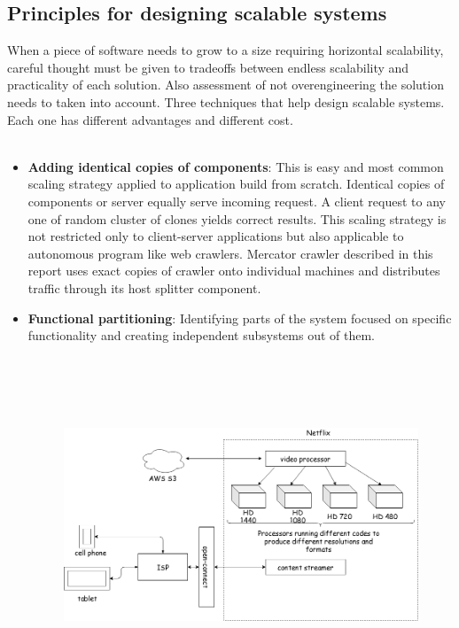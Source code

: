 \subsection{Principles for designing scalable systems}\label{appstate}
When a piece of software needs to grow to a size requiring horizontal scalability, careful thought must
be given to tradeoffs between endless scalability and practicality of each solution. Also assessment of not
overengineering the solution needs to taken into account. Three techniques that help design scalable
systems. Each one has different advantages and different cost.
\\
\\
\begin{itemize}
\item \textbf{Adding identical copies of components}\cite{scalaberules}: This is easy and most common scaling strategy
  applied to application build from scratch. Identical copies of components or server equally serve
  incoming request. A client request to any one of random cluster of clones yields correct results.
  This scaling strategy is not restricted only to client-server applications but also applicable to
  autonomous program like web crawlers. Mercator crawler described in this report uses exact copies
  of crawler onto individual machines and distributes traffic through its host splitter component.
\item \textbf{Functional partitioning}\cite{scalaberules}: Identifying parts of the system focused on specific functionality
  and creating independent subsystems out of them.
  \begin{figure}[h!]
    \centering
    \includegraphics[width=13cm,height=10cm,keepaspectratio]{../media/crawler/netflix.png}

\end{figure}
\end{itemize}
